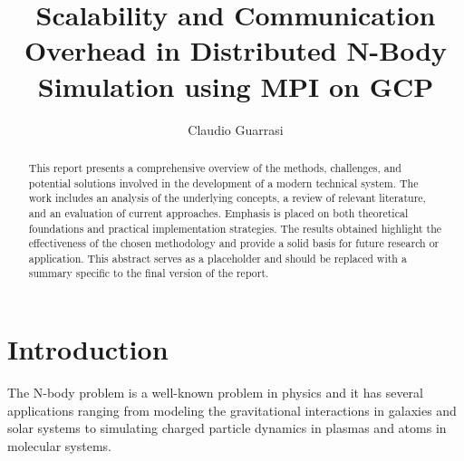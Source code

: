 \documentclass{article}
\title{\textbf{Scalability and Communication Overhead in Distributed N-Body Simulation using MPI on GCP}\\}
\author{Claudio Guarrasi\\[1ex]}
\date{%
	\today
	\vspace{-0.25cm}
	\\
	\rule{\textwidth}{0.3pt}}
\begin{document}
\begin{titlingpage}

\maketitle %
\thispagestyle{empty} %
\begin{abstract}
This report presents a comprehensive overview of the methods, challenges, and potential solutions involved in the development of a modern technical system. The work includes an analysis of the underlying concepts, a review of relevant literature, and an evaluation of current approaches. Emphasis is placed on both theoretical foundations and practical implementation strategies. The results obtained highlight the effectiveness of the chosen methodology and provide a solid basis for future research or application. This abstract serves as a placeholder and should be replaced with a summary specific to the final version of the report.
\end{abstract}
\end{titlingpage}
\tableofcontents

\thispagestyle{plain}

\twocolumn

\section{Introduction}
\label{sec:intro}
The N-body problem is a well-known problem in physics and it has several applications ranging from modeling the gravitational interactions in galaxies and solar systems to simulating charged particle dynamics in plasmas and atoms in molecular systems.
\end{document}
